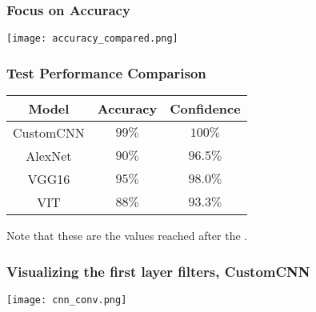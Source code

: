 \documentclass[../presentation.tex]{subfiles} %
\begin{document}
\begin{frame}
    \frametitle{Focus on Accuracy}
    \begin{center}
        \texttt{[image: accuracy\_compared.png]}
    \end{center}
\end{frame}

\begin{frame}
    \frametitle{Test Performance Comparison}


		\begin{table}[htb]
			\renewcommand{\arraystretch}{1.5} %
			\centering
			\begin{tabular}{|c|c|c|}

				\hline
				\rowcolor{boxcolor}
				\textbf{Model} &
				\textbf{Accuracy} &
				\textbf{Confidence} \\

				\hline
				CustomCNN & $99\%$ & $100\%$ \\
				AlexNet & $90\%$ & $96.5\%$ \\
				VGG16 & $95\%$ & $98.0\%$ \\
				VIT & $88\%$ & $93.3\%$ \\
				\hline

			\end{tabular}
			\renewcommand{\arraystretch}{1} %

		\end{table}

		\begin{warning}
			Note that these are the values reached after the .
		\end{warning}

\end{frame}

\begin{frame}
    \frametitle{Visualizing the first layer filters, CustomCNN}
    \begin{center}
        \texttt{[image: cnn\_conv.png]}
    \end{center}
\end{frame}
\end{document}
